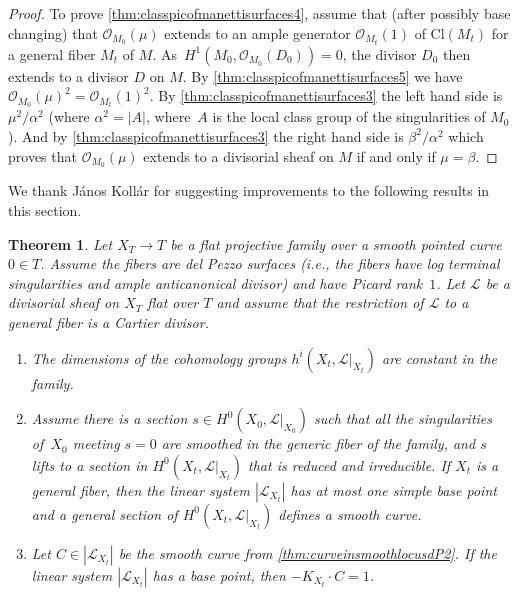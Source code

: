 \documentclass[11pt]{article}
\newcommand{\ie}{i.e.,\xspace}
\theoremstyle{plain}
\newtheorem{theorem}{Theorem}[section]
\theoremstyle{definition}
\newcommand\Lc{{\mathcal L}}
\newcommand\Oc{{\mathcal O}}
\newcommand\Cl{{\mathrm{Cl}}}
\begin{document}
\begin{proof}
To prove \eqref{thm:classpicofmanettisurfaces4}, assume that (after possibly base changing) that $\Oc_{M_0}(\mu)$ extends to an ample generator $\Oc_{M_t}(1)$ of $\Cl(M_t)$ for a general fiber $M_t$ of $M$.
As~$H^1(M_0, \Oc_{M_0}(D_0)) = 0$, the divisor $D_0$ then extends to a divisor $D$ on $M$. By \eqref{thm:classpicofmanettisurfaces5} we have $\Oc_{M_0}(\mu)^2 = \Oc_{M_t}(1)^2$. By \eqref{thm:classpicofmanettisurfaces3} the left hand side is $\mu^2/\alpha^2$ (where $\alpha^2 = |A|$, where~$A$ is the local class group of the singularities of $M_0$). And by \eqref{thm:classpicofmanettisurfaces3} the right hand side is $\beta^2/\alpha^2$ which proves that $\Oc_{M_0}(\mu)$ extends to a divisorial sheaf on $M$ if and only if $\mu = \beta$.
\end{proof}

We thank János Kollár for suggesting improvements to the following results in this section.

\begin{theorem}\label{thm:curveinsmoothlocusdP}
Let $X_T\to T$ be a flat projective family over a smooth pointed curve $0\in T$. Assume the fibers are del Pezzo surfaces (\ie the fibers have log terminal singularities and ample anticanonical divisor) and have Picard rank~$1$. Let $\Lc$ be a divisorial sheaf on $X_T$ flat over $T$ and assume that the restriction of $\Lc$ to a general fiber is a Cartier divisor.
\begin{enumerate}
\item\label{thm:curveinsmoothlocusdP1} The dimensions of the cohomology groups $h^i(X_t,\Lc|_{X_t})$ are constant in the family.
\item\label{thm:curveinsmoothlocusdP2} Assume there is a section $s\in H^0(X_0,\Lc|_{X_0})$ such that all the singularities of~$X_0$ meeting $s=0$ are smoothed in the generic fiber of the family, and $s$ lifts to a section in $H^0(X_t,\Lc|_{X_t})$ that is reduced and irreducible. If $X_t$ is a general fiber, then the linear system $|\Lc_{X_t}|$ has at most one simple base point and a general section of $H^0(X_t,\Lc|_{X_t})$ defines a smooth curve.
\item\label{thm:curveinsmoothlocusdP3} Let $C \in |\Lc_{X_t}| $ be the smooth curve from \eqref{thm:curveinsmoothlocusdP2}. If the linear system $|\Lc_{X_t}|$ has a base point, then $-K_{X_t}\cdot C = 1$.
\end{enumerate}
\end{theorem}
\end{document}
